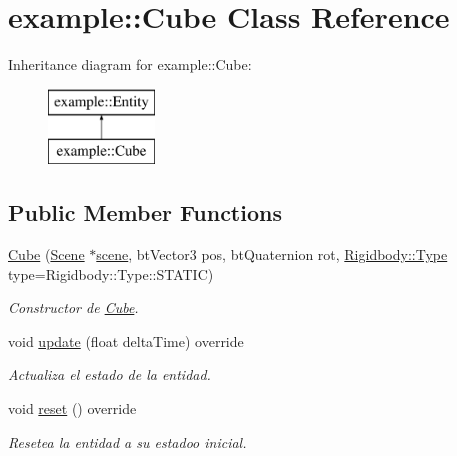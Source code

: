 \hypertarget{classexample_1_1_cube}{}\section{example\+::Cube Class Reference}
\label{classexample_1_1_cube}
Inheritance diagram for example\+::Cube\+:\begin{figure}[H]
\begin{center}
\leavevmode
\includegraphics[height=2.000000cm]{classexample_1_1_cube}
\end{center}
\end{figure}
\subsection*{Public Member Functions}
\begin{DoxyCompactItemize}
\item 
\mbox{\hyperlink{classexample_1_1_cube_a67ebb60466f09072ab84740790217a01}{Cube}} (\mbox{\hyperlink{classexample_1_1_scene}{Scene}} $\ast$\mbox{\hyperlink{classexample_1_1_entity_ab851dbde4a16829f9fb77ab9a66b9f1e}{scene}}, bt\+Vector3 pos, bt\+Quaternion rot, \mbox{\hyperlink{classexample_1_1_rigidbody_a527ee68e1748a5a6014b7fcbe9f86e3d}{Rigidbody\+::\+Type}} type=Rigidbody\+::\+Type\+::\+S\+T\+A\+T\+IC)
\begin{DoxyCompactList}\small\item\em Constructor de \mbox{\hyperlink{classexample_1_1_cube}{Cube}}. \end{DoxyCompactList}\item 
void \mbox{\hyperlink{classexample_1_1_cube_a16f3dba5c798aa09c8548e7d8d033b25}{update}} (float delta\+Time) override
\begin{DoxyCompactList}\small\item\em Actualiza el estado de la entidad. \end{DoxyCompactList}\item 
void \mbox{\hyperlink{classexample_1_1_cube_ac584c2440bddb8afdf9d2adf666ccd59}{reset}} () override
\begin{DoxyCompactList}\small\item\em Resetea la entidad a su estadoo inicial. \end{DoxyCompactList}\end{DoxyCompactItemize}
